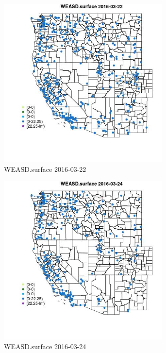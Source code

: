 \begin{figure} 
\centering  
\includegraphics[width=0.77\textwidth]{Code_Outputs/Report_ML_input_PM25_Step4_part_e_de_duplicated_aveswNAs_MapObsWEASDsurface2016-03-22.jpg} 
\caption{\label{fig:Report_ML_input_PM25_Step4_part_e_de_duplicated_aveswNAsMapObsWEASDsurface2016-03-22}WEASD.surface 2016-03-22} 
\end{figure} 
 

\begin{figure} 
\centering  
\includegraphics[width=0.77\textwidth]{Code_Outputs/Report_ML_input_PM25_Step4_part_e_de_duplicated_aveswNAs_MapObsWEASDsurface2016-03-24.jpg} 
\caption{\label{fig:Report_ML_input_PM25_Step4_part_e_de_duplicated_aveswNAsMapObsWEASDsurface2016-03-24}WEASD.surface 2016-03-24} 
\end{figure} 
 

